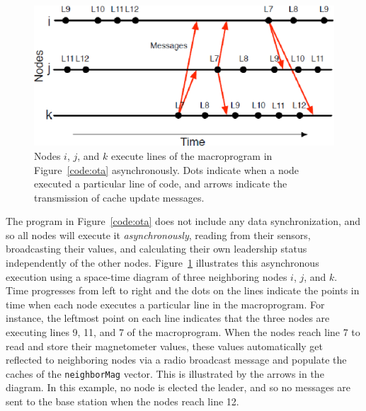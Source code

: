 \begin{figure}[t]
  \centering
  \includegraphics[scale=0.75]{fig/causality}
  \caption[Asynchronous code execution]{Nodes $i$, $j$, and $k$ execute lines of
  the macroprogram in Figure~\ref{code:ota} asynchronously.  Dots indicate when
  a node executed a particular line of code, and arrows indicate the
  transmission of cache update messages.}
  \label{fig:causallyRelated}
\end{figure}

The program in Figure~\ref{code:ota} does not include any data synchronization,
and so all nodes will execute it \emph{asynchronously}, reading from their
sensors, broadcasting their values, and calculating their own leadership status
independently of the other nodes.  Figure~\ref{fig:causallyRelated} illustrates
this asynchronous execution using a space-time diagram of three neighboring
nodes $i$, $j$, and $k$.  Time progresses from left to right and the dots on the
lines indicate the points in time when each node executes a particular line in
the macroprogram. For instance, the leftmost point on each line indicates that
the three nodes are executing lines 9, 11, and 7 of the macroprogram.  When the
nodes reach line 7 to read and store their magnetometer values, these values
automatically get reflected to neighboring nodes via a radio broadcast message
and populate the caches of the {\tt neighborMag} vector.  This is illustrated by
the arrows in the diagram.  In this example, no node is elected the leader, and
so no messages are sent to the base station when the nodes reach line 12.

